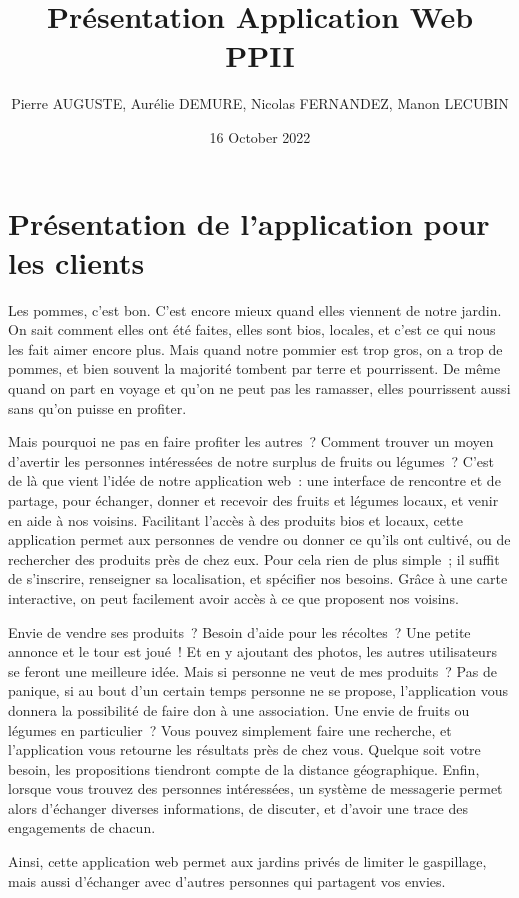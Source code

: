\documentclass{article}
\title{Présentation Application Web PPII}
\author{Pierre AUGUSTE, Aurélie DEMURE, Nicolas FERNANDEZ, Manon LECUBIN}
\date{16 October 2022}
\begin{document}
\maketitle
\section{Présentation de l'application pour les clients}

	Les pommes, c'est bon. C'est encore mieux quand elles viennent de notre jardin. On sait comment elles ont été faites, elles sont bios, locales, et c'est ce qui nous les fait aimer encore plus. Mais quand notre pommier est trop gros, on a trop de pommes, et bien souvent la majorité tombent par terre et pourrissent. De même quand on part en voyage et qu'on ne peut pas les ramasser, elles pourrissent aussi sans qu'on puisse en profiter.

	Mais pourquoi ne pas en faire profiter les autres ? Comment trouver un moyen d'avertir les personnes intéressées de notre surplus de fruits ou légumes ? C'est de là que vient l'idée de notre application web : une interface de rencontre et de partage, pour échanger, donner et recevoir des fruits et légumes locaux, et venir en aide à nos voisins.
	Facilitant l'accès à des produits bios et locaux, cette application permet aux personnes de vendre ou donner ce qu'ils ont cultivé, ou de rechercher des produits près de chez eux. Pour cela rien de plus simple ; il suffit de s'inscrire, renseigner sa localisation, et spécifier nos besoins. Grâce à une carte interactive, on peut facilement avoir accès à ce que proposent nos voisins.

	Envie de vendre ses produits ? Besoin d'aide pour les récoltes ? Une petite annonce et le tour est joué ! Et en y ajoutant des photos, les autres utilisateurs se feront une meilleure idée. Mais si personne ne veut de mes produits ? Pas de panique, si au bout d'un certain temps personne ne se propose, l'application vous donnera la possibilité de faire don à une association.
	Une envie de fruits ou légumes en particulier ? Vous pouvez simplement faire une recherche, et l'application vous retourne les résultats près de chez vous. Quelque soit votre besoin, les propositions tiendront compte de la distance géographique.
	Enfin, lorsque vous trouvez des personnes intéressées, un système de messagerie permet alors d'échanger diverses informations, de discuter, et d'avoir une trace des engagements de chacun.

	Ainsi, cette application web permet aux jardins privés de limiter le gaspillage, mais aussi d'échanger avec d'autres personnes qui partagent vos envies.
\end{document}
